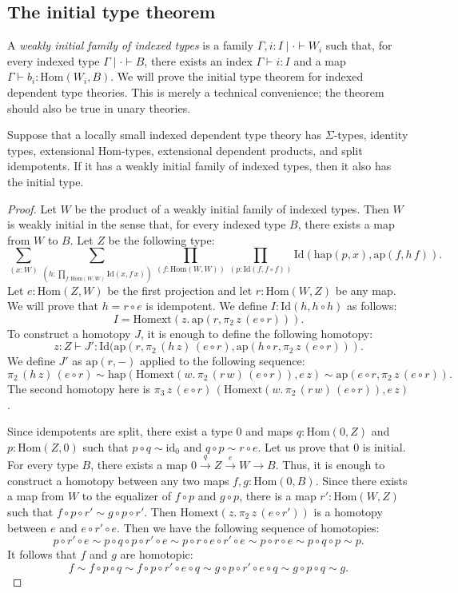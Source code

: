 \documentclass[reqno]{mscs}
\newcommand{\ob}{}
\newcommand{\fs}[1]{\mathrm{#1}}
\newcommand{\Hom}{\fs{Hom}}
\newcommand{\Id}{\fs{Id}}
\newcommand{\id}{\fs{id}}
\newcommand{\pmap}{\fs{ap}}
\newcommand{\Idext}{\fs{Homext}}
\numberwithin{figure}{section}
\begin{document}
\subsection{The initial type theorem}

A \emph{weakly initial family of indexed types} is a family $\Gamma, i : I \mid \cdot \vdash W_i \ob$ such that, for every indexed type $\Gamma \mid \cdot \vdash B \ob$, there exists an index $\Gamma \vdash i : I$ and a map $\Gamma \vdash b_i : \Hom(W_i,B)$.
We will prove the initial type theorem for indexed dependent type theories.
This is merely a technical convenience; the theorem should also be true in unary theories.

\begin{thm}
Suppose that a locally small indexed dependent type theory has $\Sigma$-types, identity types, extensional $\Hom$-types, extensional dependent products, and split idempotents.
If it has a weakly initial family of indexed types, then it also has the initial type.
\end{thm}
\begin{proof}
Let $W$ be the product of a weakly initial family of indexed types.
Then $W$ is weakly initial in the sense that, for every indexed type $B$, there exists a map from $W$ to $B$.
Let $Z$ be the following type:
\[ \sum_{(x : W)} \sum_{(h : \prod_{f : \Hom(W,W)} \Id(x,f\,x))} \prod_{(f : \Hom(W,W))} \prod_{(p : \Id(f, f \circ f))} \Id(\fs{hap}(p,x),\pmap(f,h\,f)). \]
Let $e : \Hom(Z,W)$ be the first projection and let $r : \Hom(W,Z)$ be any map.
We will prove that $h = r \circ e$ is idempotent.
We define $I : \Id(h, h \circ h)$ as follows:
\[ I = \Idext(z.\,\pmap(r, \pi_2\,z\,(e \circ r))). \]
To construct a homotopy $J$, it is enough to define the following homotopy:
\[ z : Z \vdash J' : \Id(\pmap(r, \pi_2\,(h\,z)\,(e \circ r), \pmap(h \circ r, \pi_2\,z\,(e \circ r))). \]
We define $J'$ as $\pmap(r,-)$ applied to the following sequence:
\[ \pi_2\,(h\,z)\,(e \circ r) \sim \fs{hap}(\Idext(w.\,\pi_2\,(r\,w)\,(e \circ r)),e\,z) \sim \pmap(e \circ r, \pi_2\,z\,(e \circ r)). \]
The second homotopy here is $\pi_3\,z\,(e \circ r)\,(\Idext(w.\,\pi_2\,(r\,w)\,(e \circ r)),e\,z)$.

Since idempotents are split, there exist a type $0$ and maps $q : \Hom(0,Z)$ and $p : \Hom(Z,0)$ such that $p \circ q \sim \id_0$ and $q \circ p \sim r \circ e$.
Let us prove that $0$ is initial.
For every type $B$, there exists a map $0 \xrightarrow{q} Z \xrightarrow{e} W \to B$.
Thus, it is enough to construct a homotopy between any two maps $f,g : \Hom(0,B)$.
Since there exists a map from $W$ to the equalizer of $f \circ p$ and $g \circ p$, there is a map $r' : \Hom(W,Z)$ such that $f \circ p \circ r' \sim g \circ p \circ r'$.
Then $\Idext(z.\,\pi_2\,z\,(e \circ r'))$ is a homotopy between $e$ and $e \circ r' \circ e$.
Then we have the following sequence of homotopies:
\[ p \circ r' \circ e \sim p \circ q \circ p \circ r' \circ e \sim p \circ r \circ e \circ r' \circ e \sim p \circ r \circ e \sim p \circ q \circ p \sim p. \]
It follows that $f$ and $g$ are homotopic:
\[ f \sim f \circ p \circ q \sim f \circ p \circ r' \circ e \circ q \sim g \circ p \circ r' \circ e \circ q \sim g \circ p \circ q \sim g. \]
\end{proof}
\end{document}
